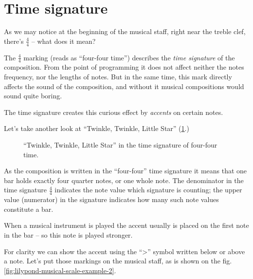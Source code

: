\documentclass[../sparc.tex]{subfiles}
\begin{document}
\section{Time signature}

As we may notice at the beginning of the musical staff, right near the treble
clef, there's $\frac{4}{4}$ -- what does it mean?

The $\frac{4}{4}$ marking (reads as ``four-four time'') describes the \emph{time
signature} of the composition.  From the point of programming it does not affect
neither the notes frequency, nor the lengths of notes.  But in the same time,
this mark directly affects the sound of the composition, and without it musical
compositions would sound quite boring.

The time signature creates this curious effect by \emph{accents} on certain
notes.

Let's take another look at ``Twinkle, Twinkle, Little Star''
(\ref{fig:lilypond-musical-scale-example-1}.)

\begin{figure}[ht]
  \centering
  \caption{``Twinkle, Twinkle, Little Star'' in the time signature of four-four
    time.}
  \label{fig:lilypond-musical-scale-example-1}
\end{figure}

As the composition is written in the ``four-four'' time signature it means that
one bar holds exactly four quarter notes, or one whole note.  The denominator in
the time signature $\frac{4}{4}$ indicates the note value which signature is
counting; the upper value (numerator) in the signature indicates how many such
note values constitute a bar.

When a musical instrument is played the accent usually is placed on the first
note in the bar -- so this note is played stronger.

For clarity we can show the accent using the ``>'' symbol written below or above
a note.  Let's put those markings on the musical staff, as is shown on the
fig. \ref{fig:lilypond-musical-scale-example-2}.
\end{document}
